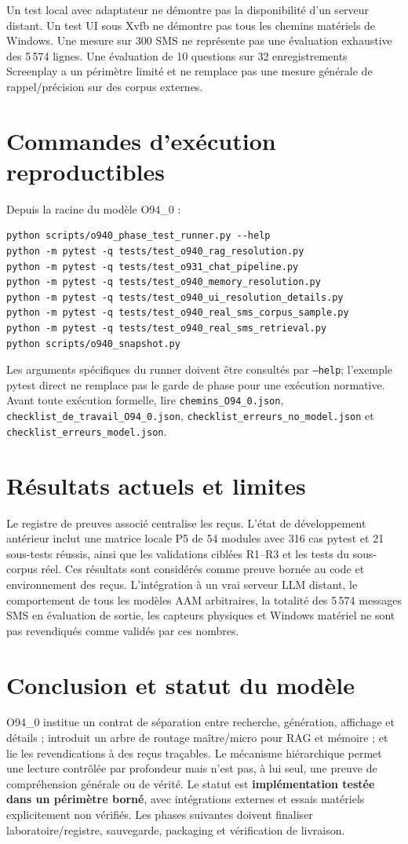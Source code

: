 \documentclass[11pt,a4paper]{article}
\begin{document}
Un test local avec adaptateur ne démontre pas la disponibilité d'un serveur distant. Un test UI sous Xvfb ne démontre pas tous les chemins matériels de Windows. Une mesure sur 300 SMS ne représente pas une évaluation exhaustive des 5\,574 lignes. Une évaluation de 10 questions sur 32 enregistrements Screenplay a un périmètre limité et ne remplace pas une mesure générale de rappel/précision sur des corpus externes.

\section{Commandes d'exécution reproductibles}
Depuis la racine du modèle O94\_0 :
\begin{verbatim}
python scripts/o940_phase_test_runner.py --help
python -m pytest -q tests/test_o940_rag_resolution.py
python -m pytest -q tests/test_o931_chat_pipeline.py
python -m pytest -q tests/test_o940_memory_resolution.py
python -m pytest -q tests/test_o940_ui_resolution_details.py
python -m pytest -q tests/test_o940_real_sms_corpus_sample.py
python -m pytest -q tests/test_o940_real_sms_retrieval.py
python scripts/o940_snapshot.py
\end{verbatim}
Les arguments spécifiques du runner doivent être consultés par \texttt{--help}; l'exemple pytest direct ne remplace pas le garde de phase pour une exécution normative. Avant toute exécution formelle, lire \texttt{chemins\_O94\_0.json}, \texttt{checklist\_de\_travail\_O94\_0.json}, \texttt{checklist\_erreurs\_no\_model.json} et \texttt{checklist\_erreurs\_model.json}.

\section{Résultats actuels et limites}
Le registre de preuves associé centralise les reçus. L'état de développement antérieur inclut une matrice locale P5 de 54 modules avec 316 cas pytest et 21 sous-tests réussis, ainsi que les validations ciblées R1--R3 et les tests du sous-corpus réel. Ces résultats sont considérés comme preuve bornée au code et environnement des reçus. L'intégration à un vrai serveur LLM distant, le comportement de tous les modèles AAM arbitraires, la totalité des 5\,574 messages SMS en évaluation de sortie, les capteurs physiques et Windows matériel ne sont pas revendiqués comme validés par ces nombres.

\section{Conclusion et statut du modèle}
O94\_0 institue un contrat de séparation entre recherche, génération, affichage et détails ; introduit un arbre de routage maître/micro pour RAG et mémoire ; et lie les revendications à des reçus traçables. Le mécanisme hiérarchique permet une lecture contrôlée par profondeur mais n'est pas, à lui seul, une preuve de compréhension générale ou de vérité. Le statut est \textbf{implémentation testée dans un périmètre borné}, avec intégrations externes et essais matériels explicitement non vérifiés. Les phases suivantes doivent finaliser laboratoire/registre, sauvegarde, packaging et vérification de livraison.
\end{document}
